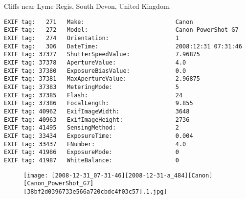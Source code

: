 \section{\protect{}}
\noindent Cliffs near Lyme Regis, South Devon, United Kingdom.
\noindent
\begin{lstlisting}
EXIF tag:   271   Make:                          Canon
EXIF tag:   272   Model:                         Canon PowerShot G7
EXIF tag:   274   Orientation:                   1
EXIF tag:   306   DateTime:                      2008:12:31 07:31:46
EXIF tag: 37377   ShutterSpeedValue:             7.96875
EXIF tag: 37378   ApertureValue:                 4.0
EXIF tag: 37380   ExposureBiasValue:             0.0
EXIF tag: 37381   MaxApertureValue:              2.96875
EXIF tag: 37383   MeteringMode:                  5
EXIF tag: 37385   Flash:                         24
EXIF tag: 37386   FocalLength:                   9.855
EXIF tag: 40962   ExifImageWidth:                3648
EXIF tag: 40963   ExifImageHeight:               2736
EXIF tag: 41495   SensingMethod:                 2
EXIF tag: 33434   ExposureTime:                  0.004
EXIF tag: 33437   FNumber:                       4.0
EXIF tag: 41986   ExposureMode:                  0
EXIF tag: 41987   WhiteBalance:                  0

\end{lstlisting}
\clearpage
\begin{figure}
\raggedleft
\texttt{[image: [2008-12-31\_07-31-46][2008-12-31-a\_484][Canon][Canon\_PowerShot\_G7][38bf2d0396733e566a720cbdc4f03c57].1.jpg]}
\end{figure}


\clearpage
